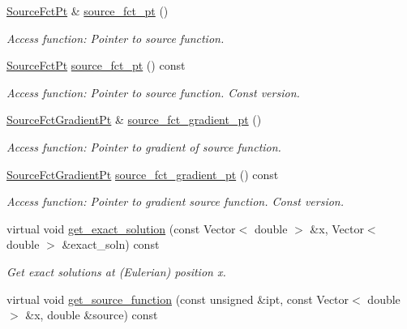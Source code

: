 \begin{DoxyCompactItemize}
\hyperlink{classoomph_1_1MyBiharmonicEquations_a17bd58054c66229016eb1c52eab36bc1}{Source\+Fct\+Pt} \& \hyperlink{classoomph_1_1MyBiharmonicEquations_afbb201cb342fef337cfce82a776fa2b3}{source\+\_\+fct\+\_\+pt} ()
\begin{DoxyCompactList}\small\item\em Access function\+: Pointer to source function. \end{DoxyCompactList}\item 
\hyperlink{classoomph_1_1MyBiharmonicEquations_a17bd58054c66229016eb1c52eab36bc1}{Source\+Fct\+Pt} \hyperlink{classoomph_1_1MyBiharmonicEquations_a1c2d7933266cf773e3729fb236bc13be}{source\+\_\+fct\+\_\+pt} () const
\begin{DoxyCompactList}\small\item\em Access function\+: Pointer to source function. Const version. \end{DoxyCompactList}\item 
\hyperlink{classoomph_1_1MyBiharmonicEquations_af007c03701e888fed7375cb4537f0046}{Source\+Fct\+Gradient\+Pt} \& \hyperlink{classoomph_1_1MyBiharmonicEquations_a9da77a58e4d4a96e6cfe1eb708bca631}{source\+\_\+fct\+\_\+gradient\+\_\+pt} ()
\begin{DoxyCompactList}\small\item\em Access function\+: Pointer to gradient of source function. \end{DoxyCompactList}\item 
\hyperlink{classoomph_1_1MyBiharmonicEquations_af007c03701e888fed7375cb4537f0046}{Source\+Fct\+Gradient\+Pt} \hyperlink{classoomph_1_1MyBiharmonicEquations_a3c6a713fdc0847a374c58ef4760046ec}{source\+\_\+fct\+\_\+gradient\+\_\+pt} () const
\begin{DoxyCompactList}\small\item\em Access function\+: Pointer to gradient source function. Const version. \end{DoxyCompactList}\item 
virtual void \hyperlink{classoomph_1_1MyBiharmonicEquations_a133c73b73001c9c02ab36cfd0415eb49}{get\+\_\+exact\+\_\+solution} (const Vector$<$ double $>$ \&x, Vector$<$ double $>$ \&exact\+\_\+soln) const
\begin{DoxyCompactList}\small\item\em Get exact solutions at (Eulerian) position x. \end{DoxyCompactList}\item 
virtual void \hyperlink{classoomph_1_1MyBiharmonicEquations_a30d824f604ff00b823238d5b18561693}{get\+\_\+source\+\_\+function} (const unsigned \&ipt, const Vector$<$ double $>$ \&x, double \&source) const

\end{DoxyCompactItemize}
